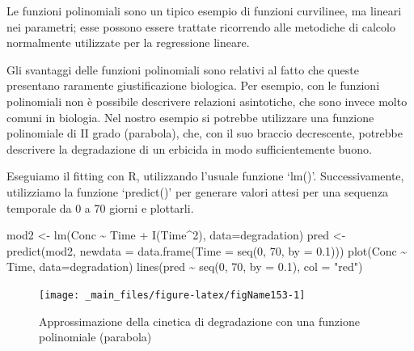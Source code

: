 \documentclass[a4paper,12pt,oneside]{book}
\newenvironment{Shaded}{\begin{snugshade}}{\end{snugshade}}
\newcommand{\DecValTok}[1]{#1}
\newcommand{\FloatTok}[1]{#1}
\newcommand{\SpecialCharTok}[1]{#1}
\newcommand{\StringTok}[1]{#1}
\newcommand{\OtherTok}[1]{#1}
\newcommand{\FunctionTok}[1]{#1}
\newcommand{\AttributeTok}[1]{#1}
\newcommand{\NormalTok}[1]{#1}
\begin{document}
Le funzioni polinomiali sono un tipico esempio di funzioni curvilinee, ma lineari nei parametri; esse possono essere trattate ricorrendo alle metodiche di calcolo normalmente utilizzate per la regressione lineare.

Gli svantaggi delle funzioni polinomiali sono relativi al fatto che queste presentano raramente giustificazione biologica. Per esempio, con le funzioni polinomiali non è possibile descrivere relazioni asintotiche, che sono invece molto comuni in biologia. Nel nostro esempio si potrebbe utilizzare una funzione polinomiale di II grado (parabola), che, con il suo braccio decrescente, potrebbe descrivere la degradazione di un erbicida in modo sufficientemente buono.

Eseguiamo il fitting con R, utilizzando l'usuale funzione `lm()'. Successivamente, utilizziamo la funzione `predict()' per generare valori attesi per una sequenza temporale da 0 a 70 giorni e plottarli.

\begin{Shaded}
\begin{Highlighting}[]
\NormalTok{mod2 }\OtherTok{\textless{}{-}} \FunctionTok{lm}\NormalTok{(Conc }\SpecialCharTok{\textasciitilde{}}\NormalTok{ Time }\SpecialCharTok{+} \FunctionTok{I}\NormalTok{(Time}\SpecialCharTok{\^{}}\DecValTok{2}\NormalTok{), }\AttributeTok{data=}\NormalTok{degradation)}
\NormalTok{pred }\OtherTok{\textless{}{-}} \FunctionTok{predict}\NormalTok{(mod2, }\AttributeTok{newdata =} \FunctionTok{data.frame}\NormalTok{(}\AttributeTok{Time =} \FunctionTok{seq}\NormalTok{(}\DecValTok{0}\NormalTok{, }\DecValTok{70}\NormalTok{, }\AttributeTok{by =} \FloatTok{0.1}\NormalTok{)))}
\FunctionTok{plot}\NormalTok{(Conc }\SpecialCharTok{\textasciitilde{}}\NormalTok{ Time, }\AttributeTok{data=}\NormalTok{degradation)}
\FunctionTok{lines}\NormalTok{(pred }\SpecialCharTok{\textasciitilde{}} \FunctionTok{seq}\NormalTok{(}\DecValTok{0}\NormalTok{, }\DecValTok{70}\NormalTok{, }\AttributeTok{by =} \FloatTok{0.1}\NormalTok{), }\AttributeTok{col =} \StringTok{"red"}\NormalTok{)}
\end{Highlighting}
\end{Shaded}

\begin{figure}

{\centering \texttt{[image: \_main\_files/figure-latex/figName153-1]} 

}

\caption{Approssimazione della cinetica di degradazione con una funzione polinomiale (parabola)}\label{fig:figName153}
\end{figure}
\end{document}
